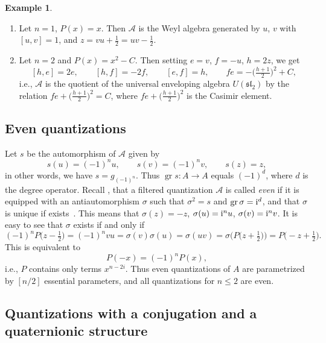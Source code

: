 \documentclass[pdftex]{sigma}
\newcommand{\gr}{\mathop{\mathrm{gr}}\nolimits}
\newcommand{\mc}[1]{\mathcal{#1}}
\theoremstyle{definition}
\newtheorem{Example}[Theorem]{Example}
\numberwithin{equation}{section}
\begin{document}
\begin{Example} \qquad
\begin{enumerate}\itemsep=0pt
\item[$1.$] Let $n=1$, $P(x)=x$. Then $\mc A$ is the Weyl algebra
generated by $u$, $v$ with $[u,v]=1$, and $z=vu+\tfrac{1}{2}=uv-\tfrac{1}{2}$.

\item[$2.$] Let $n=2$ and $P(x)=x^2-C$. Then setting $e=v$, $f=-u$, $h=2z$, we get
\[
[h,e]=2e,\qquad
[h,f]=-2f,\qquad
[e,f]=h,\qquad
fe=-\big(\tfrac{h+1}{2}\big)^2+C,
\]
i.e., $\mc A$ is the quotient of the universal enveloping algebra $U(\mathfrak{sl}_2)$ by the relation $fe+\big(\tfrac{h+1}{2}\big)^2=C$, where $fe+\big(\tfrac{h+1}{2}\big)^2$ is the Casimir element.
\end{enumerate}
\end{Example}

\subsection{Even quantizations}
Let $s$ be the automorphism of $\mc A$
given by
\[
s(u)=(-1)^nu,\qquad s(v)=(-1)^nv,\qquad s(z)=z,
\]
in other words, we have $s=g_{(-1)^n}$. Thus $\gr s\colon A\to A$
equals $(-1)^d$, where $d$ is the degree operator.
Recall \cite[Section~2.3]{ES}, that a filtered quantization $\mathcal{A}$ is called {\it even} if it is equipped with an antiautomorphism $\sigma$ such that $\sigma^2=s$ and $\gr\sigma={\rm i}^d$, and that $\sigma$ is unique if exists~\cite[Remark~2.10]{ES}. This means that $\sigma (z)=-z$, $\sigma (u)={\rm i}^n u$, $\sigma (v)={\rm i}^n v$. It is easy to see that $\sigma$ exists if and only if
\[
(-1)^n P\big(z-\tfrac{1}{2}\big)=(-1)^n vu=\sigma(v)\sigma(u)=\sigma (uv)=\sigma\big(P\big(z+\tfrac{1}{2}\big)\big)=P\big({-}z+\tfrac{1}{2}\big).
\]
This is equivalent to
\[
P(-x)=(-1)^n P(x),
\]
i.e., $P$ contains only terms $x^{n-2i}$. Thus even quantizations of $A$ are parametrized by $[n/2]$ essential parameters, and all quantizations for $n\le 2$ are even.

\subsection{Quantizations with a conjugation and a quaternionic structure}\label{conju}
\end{document}
